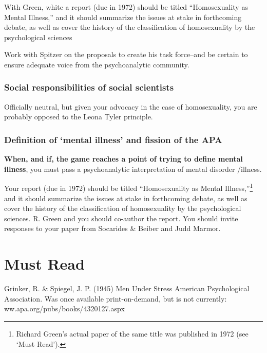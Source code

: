 \begin{refsection}
\begin{writingtask}[Spiegel]\label{writingtask:spiegel}
With Green, white a report (due in 1972) should be titled “Homosexuality as Mental Illness,” and it should summarize the issues at stake in forthcoming debate, as well as cover the history of the classification of homosexuality by the psychological sciences
\end{writingtask}

Work with Spitzer on the proposals to create his task force--and be certain to ensure adequate voice from the psychoanalytic community.

\subsubsection{Social responsibilities of social scientists}
\label{socialresponsibilitiesofsocialscientists}

Officially neutral, but given your advocacy in the case of homosexuality, you are probably opposed to the Leona Tyler principle.

\subsubsection{Definition of ‘mental illness’ and fission of the APA}
\label{definitionof‘mentalillness’andfissionoftheapa}

\textbf{When, and if, the game reaches a point of trying to define mental illness}, you must pass a psychoanalytic interpretation of mental disorder \slash  illness.

Your report (due in 1972) should be titled “Homosexuality as Mental Illness,”\footnote{Richard Green's actual paper of the same title was published in 1972 (see `Must Read').} and it should summarize the issues at stake in forthcoming debate, as well as cover the history of the classification of homosexuality by the psychological sciences. R. Green and you should co-author the report. You should invite responses to your paper from Socarides \& Beiber and Judd Marmor.

\section{Must Read}
\label{mustread}

Grinker, R. \& Spiegel, J. P. (1945) Men Under Stress American Psychological Association. Was once available print-on-demand, but is not currently: ww.apa.org\slash pubs\slash books\slash 4320127.aspx


\end{refsection}
